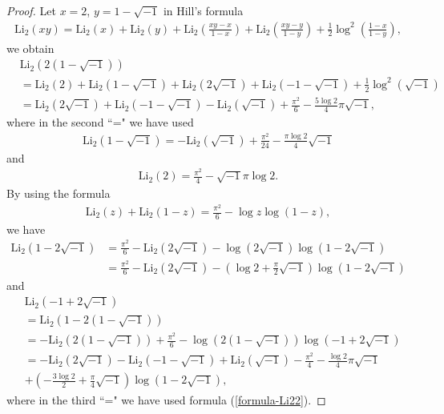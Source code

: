 \documentclass[12pt]{amsart}
\begin{document}
\begin{proof}
Let $x=2$, $y=1-\sqrt{-1}$ in Hill's formula 
\begin{align}
\text{Li}_2(xy)=\text{Li}_2(x)+\text{Li}_2(y)+\text{Li}_2(\frac{xy-x}{1-x})+\text{Li}_2(\frac{xy-y}{1-y})+\frac{1}{2}\log^2\left(\frac{1-x}{1-y}\right),   
\end{align}
we obtain
\begin{align} \label{formula-Li22}
&\text{Li}_2(2(1-\sqrt{-1}))\\\nonumber
&=\text{Li}_2(2)+\text{Li}_2(1-\sqrt{-1})+\text{Li}_2(2\sqrt{-1})+\text{Li}_2(-1-\sqrt{-1})+\frac{1}{2}\log^2(\sqrt{-1})\\\nonumber
&=\text{Li}_2(2\sqrt{-1})+\text{Li}_2(-1-\sqrt{-1})-\text{Li}_2(\sqrt{-1})+\frac{\pi^2}{6}-\frac{5\log 2}{4}\pi\sqrt{-1},
\end{align}
where in the second ``=" we have used 
\begin{align}
\text{Li}_2(1-\sqrt{-1})=-\text{Li}_2(\sqrt{-1})+\frac{\pi^2}{24}-\frac{\pi\log 2}{4}\sqrt{-1}    
\end{align}
and 
\begin{align}
  \text{Li}_2(2)=\frac{\pi^2}{4}-\sqrt{-1}\pi\log2. 
\end{align}
By using the formula  
\begin{align}
 \text{Li}_2(z)+\text{Li}_2(1-z)=\frac{\pi^2}{6}-\log z\log(1-z),   
\end{align}
we have
\begin{align}
\text{Li}_2(1-2\sqrt{-1})&=\frac{\pi^2}{6}-\text{Li}_2(2\sqrt{-1})-\log(2\sqrt{-1})\log(1-2\sqrt{-1})\\\nonumber
&=\frac{\pi^2}{6}-\text{Li}_2(2\sqrt{-1})-(\log2+\frac{\pi}{2}\sqrt{-1})\log(1-2\sqrt{-1})
\end{align}
and
\begin{align}
&\text{Li}_2(-1+2\sqrt{-1})\\\nonumber
&=\text{Li}_2(1-2(1-\sqrt{-1}))\\\nonumber
&=-\text{Li}_2(2(1-\sqrt{-1}))+\frac{\pi^2}{6}-\log(2(1-\sqrt{-1}))\log(-1+2\sqrt{-1})\\\nonumber
&=-\text{Li}_2(2\sqrt{-1})-\text{Li}_2(-1-\sqrt{-1})+\text{Li}_2(\sqrt{-1})-\frac{\pi^2}{4}-\frac{\log 2}{4}\pi\sqrt{-1}\\\nonumber
&+\left(-\frac{3\log2}{2}+\frac{\pi}{4}\sqrt{-1}\right)\log(1-2\sqrt{-1}),
\end{align}
where in the third ``=" we have used formula (\ref{formula-Li22}). 


\end{proof}
\end{document}
